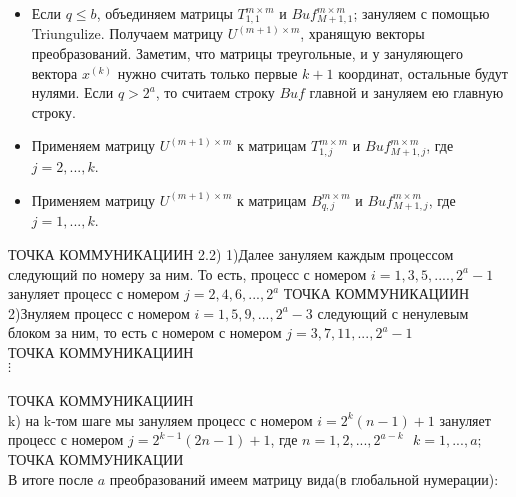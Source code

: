 \documentclass[a4paper,12pt]{article}
\begin{document}
\begin{itemize}
  \item Если $q \leq b$, объединяем матрицы $T_{1,1}^{m \times m}$ и $Buf_{M+1,1}^{m \times m}$; зануляем с помощью Triungulize. Получаем матрицу $U^{(m+1) \times m}$, хранящую векторы преобразований. Заметим, что матрицы треугольные, и у зануляющего вектора $x^{(k)}$ нужно считать только первые $k+1$ координат, остальные будут нулями. Если $q > 2^{a}$, то считаем строку $Buf$ главной и зануляем ею главную строку.
  
  \item Применяем матрицу $U^{(m+1) \times m}$ к матрицам $T_{1,j}^{m \times m}$ и $Buf_{M +1,j}^{m \times m}$, где $j = 2,...,k$.
  
  \item Применяем матрицу $U^{(m+1) \times m}$ к матрицам $B_{q,j}^{m \times m}$ и $Buf_{M+1,j}^{m \times m}$, где $j = 1,...,k$.
\end{itemize}
{\fontsize{10}{10}\selectfont ТОЧКА КОММУНИКАЦИИН}
2.2) 1)Далее зануляем каждым процессом следующий по номеру за ним. То есть, процесс с номером $i= 1,3,5,....,2^{a}-1$ зануляет процесс с номером $j = 2,4,6,...,2^{a}$ 
{\fontsize{10}{10}\selectfont ТОЧКА КОММУНИКАЦИИН}\\
2)Знуляем процесс с номером $i = 1,5,9,...,2^{a}-3$ следующий с ненулевым блоком за ним, то есть с номером с номером $j = 3,7,11,...,2^{a}-1$
\\
{\fontsize{10}{10}\selectfont ТОЧКА КОММУНИКАЦИИН}\\
$\vdots$\\
\\
{\fontsize{10}{10}\selectfont ТОЧКА КОММУНИКАЦИИН}\\
k) на k-том шаге мы зануляем процесс с номером $i = 2^{k}(n-1)+1$ зануляет процесс с номером $j = 2^{k-1}(2n-1)+1$, где $n = 1,2,...,2^{a-k} \ \ \ k = 1,...,a;$
\\
{\fontsize{10}{10}\selectfont ТОЧКА КОММУНИКАЦИИ}\\
В итоге после $a$ преобразований имеем матрицу вида(в глобальной нумерации):
\end{document}
